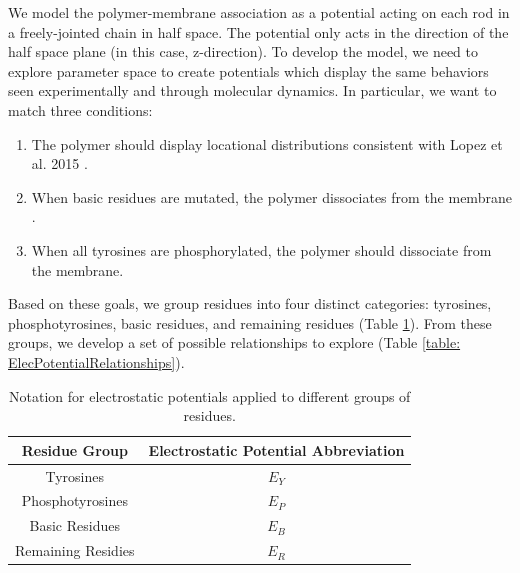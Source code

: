 \documentclass[../../AdvancementSummary.tex]{subfiles}
\begin{document}
We model the polymer-membrane association as a potential acting on each rod in a freely-jointed chain in half space. The potential only acts in the direction of the half space plane (in this case, z-direction). To develop the model, we need to explore parameter space to create potentials which display the same behaviors seen experimentally and through molecular dynamics. In particular, we want to match three conditions:

\begin{enumerate}
	\item The polymer should display locational distributions consistent with Lopez et al. 2015 \cite{Lopez2015}.
	\item When basic residues are mutated, the polymer dissociates from the membrane \cite{Zhang2011}.
	\item When all tyrosines are phosphorylated, the polymer should dissociate from the membrane. 
\end{enumerate}

Based on these goals, we group residues into four distinct categories: tyrosines, phosphotyrosines, basic residues, and remaining residues (Table \ref{table: ElecPotentialNotation}). From these groups, we develop a set of possible relationships to explore (Table \ref{table: ElecPotentialRelationships}). 

\begin{table}[H]
\caption{Notation for electrostatic potentials applied to different groups of residues. \label{table: ElecPotentialNotation}}
\begin{center}
\begin{tabular}{ c | c}
\hline
Residue Group & Electrostatic Potential Abbreviation \\
\hline
Tyrosines & $E_Y$ \\
Phosphotyrosines & $E_P$ \\
Basic Residues & $E_B$ \\
Remaining Residies & $E_R$ \\
\hline
\end{tabular}
\end{center}
\end{table}
\end{document}
